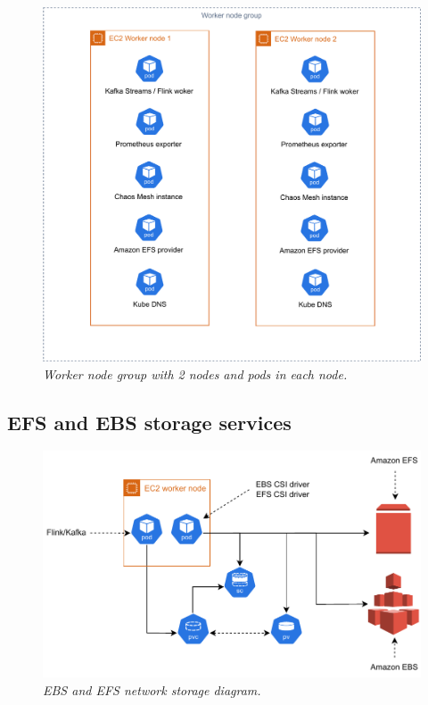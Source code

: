 \begin{figure}[ht]
    \centering
    \includegraphics[width=1\textwidth]{figures/worker-node-group}
    \caption{\textit{Worker node group with 2 nodes and pods in each node.}}
    \label{fig:worker-node-group}
\end{figure}


\subsection{EFS and EBS storage services}\label{storage-services}

\begin{figure}[ht]
    \centering
    \includegraphics[width=1\textwidth]{figures/aws-storage-pvc}
    \caption{\textit{EBS and EFS network storage diagram.}}
    \label{fig:aws-storage}
\end{figure}


